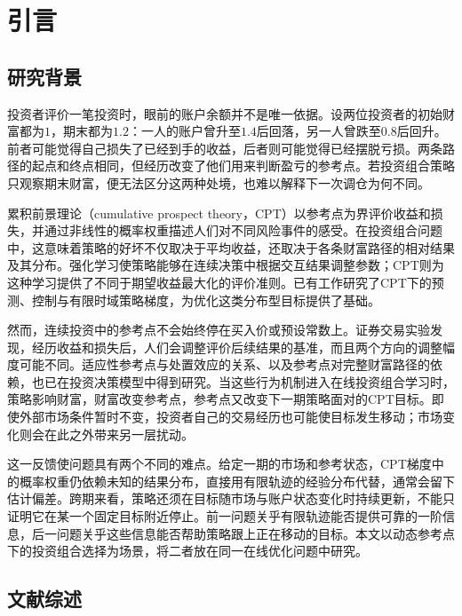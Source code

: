 \chapter{引言}\label{sec:introduction}
\section{研究背景}

投资者评价一笔投资时，眼前的账户余额并不是唯一依据。设两位投资者的初始财富都为$1$，期末都为$1.2$：一人的账户曾升至$1.4$后回落，另一人曾跌至$0.8$后回升。前者可能觉得自己损失了已经到手的收益，后者则可能觉得已经摆脱亏损。两条路径的起点和终点相同，但经历改变了他们用来判断盈亏的参考点。若投资组合策略只观察期末财富，便无法区分这两种处境，也难以解释下一次调仓为何不同。

累积前景理论（cumulative prospect theory，CPT）以参考点为界评价收益和损失，并通过非线性的概率权重描述人们对不同风险事件的感受\citep{kahneman1979prospect,tversky1992advances}。在投资组合问题中，这意味着策略的好坏不仅取决于平均收益，还取决于各条财富路径的相对结果及其分布。强化学习使策略能够在连续决策中根据交互结果调整参数；CPT则为这种学习提供了不同于期望收益最大化的评价准则。已有工作研究了CPT下的预测、控制与有限时域策略梯度，为优化这类分布型目标提供了基础\citep{prashanth2016cumulative,lepel2026policygradients}。

然而，连续投资中的参考点不会始终停在买入价或预设常数上。证券交易实验发现，经历收益和损失后，人们会调整评价后续结果的基准，而且两个方向的调整幅度可能不同\citep{arkes2008reference}。适应性参考点与处置效应的关系、以及参考点对完整财富路径的依赖，也已在投资决策模型中得到研究\citep{he2019realization,qin2022realization}。当这些行为机制进入在线投资组合学习时，策略影响财富，财富改变参考点，参考点又改变下一期策略面对的CPT目标。即使外部市场条件暂时不变，投资者自己的交易经历也可能使目标发生移动；市场变化则会在此之外带来另一层扰动。

这一反馈使问题具有两个不同的难点。给定一期的市场和参考状态，CPT梯度中的概率权重仍依赖未知的结果分布，直接用有限轨迹的经验分布代替，通常会留下估计偏差。跨期来看，策略还须在目标随市场与账户状态变化时持续更新，不能只证明它在某一个固定目标附近停止。前一问题关乎有限轨迹能否提供可靠的一阶信息，后一问题关乎这些信息能否帮助策略跟上正在移动的目标。本文以动态参考点下的投资组合选择为场景，将二者放在同一在线优化问题中研究。

\section{文献综述}\label{sec:related}

